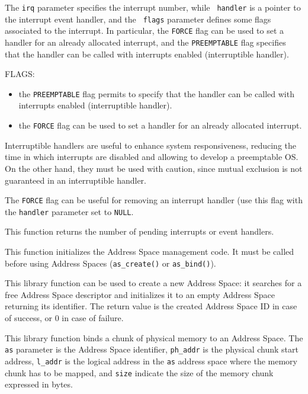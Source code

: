 \documentclass[a4paper]{report}
\begin{document}
The {\tt irq} parameter specifies the interrupt number, while {\tt
handler} is a pointer to the interrupt event handler, and the {\tt
flags} parameter defines some flags associated to the interrupt. In
particular, the {\tt FORCE} flag can be used to set a handler for an
already allocated interrupt, and the {\tt PREEMPTABLE} flag specifies
that the handler can be called with interrupts enabled (interruptible
handler).

FLAGS: \begin{itemize}
		\item the {\tt PREEMPTABLE} flag permits to specify 
				that the handler can be called with 
				interrupts enabled (interruptible handler).
		\item the {\tt FORCE} flag can be used to set a handler for
				an already allocated interrupt.
\end{itemize}

Interruptible handlers are useful to enhance system responsiveness,
reducing the time in which interrupts are disabled and allowing to
develop a preemptable OS. On the other hand, they must be used with
caution, since mutual exclusion is not guaranteed in an interruptible
handler.

The {\tt FORCE} flag can be useful for removing an interrupt handler
(use this flag with the {\tt handler} parameter set to {\tt NULL}.


This function returns the number of pending interrupts or event handlers.


This function initializes the Address Space management code. It must be
called before using Address Spaces ({\tt as\_create()} or
{\tt as\_bind()}).


This library function can be used to create a new Address Space: it
searches for a free Address Space descriptor and initializes it to an
empty Address Space returning its identifier. The return value is the
created Address Space ID in case of success, or 0 in case of failure.


This library function binds a chunk of physical memory to an Address
Space. The {\tt as} parameter is the Address Space identifier,
{\tt ph\_addr} is the physical chunk start address, {\tt l\_addr} is the
logical address in the {\tt as} address space where the memory chunk
has to be mapped, and {\tt size} indicate the size of the memory
chunk expressed in bytes.
\end{document}
